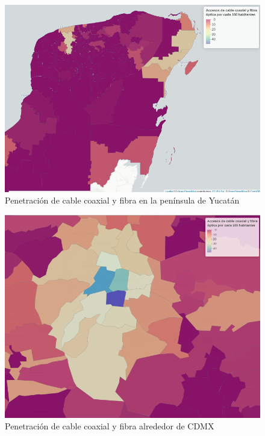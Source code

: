 \documentclass[9pt,twocolumn,twoside]{ilcss}
\begin{document}
\begin{appendices}
\begin{figure}[tbhp]
	\centering
	\includegraphics[width=0.9\linewidth]{images/pen_habs_penyuc.png}
	\caption{Penetración de cable coaxial y fibra en la península de Yucatán}
	\label{fig:pen_habs_penyuc}
\end{figure}

\begin{figure}[tbhp]
	\centering
	\includegraphics[width=0.9\linewidth]{images/pen_habs_cdmx.png}
	\caption{Penetración de cable coaxial y fibra alrededor de CDMX}
	\label{fig:pen_habs_cdmx}
\end{figure}


\end{appendices}
\end{document}
